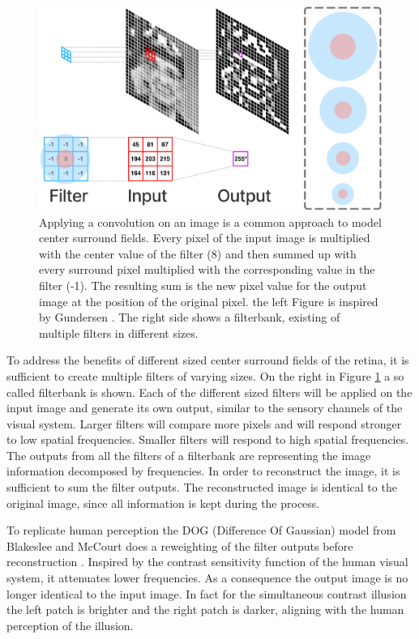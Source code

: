 \begin{figure}[H]
    \centering
    \includegraphics[width=0.7\linewidth]{media/convolution.png}
    \begin{minipage}{0.8\textwidth}
    \caption{
    Applying a convolution on an image is a common approach to model center surround
    fields. 
    Every pixel of the input image is multiplied with the center value of the filter (8)
    and then summed up with every surround pixel multiplied with the corresponding value
    in the filter (-1). The resulting sum is the new pixel value for the output image at
    the position of the original pixel. the left Figure is inspired by Gundersen
    \parencite*{Gundersen2017}. The right side shows a filterbank, existing of multiple
    filters in different sizes.}
    \label{fig:figure5}
    \end{minipage}
\end{figure}

To address the benefits of different sized center surround fields of the retina, it is
sufficient to create multiple filters of varying sizes. On the right in Figure
\ref{fig:figure5} a so called filterbank is shown. Each of the different sized filters
will be applied on the input image and generate its own output, similar to the sensory
channels of the visual system. Larger filters will compare more pixels and will respond
stronger to low spatial frequencies. Smaller filters will respond to high spatial
frequencies. The outputs from all the filters of a filterbank are representing the image
information decomposed by frequencies. In order to reconstruct the image, it is sufficient
to sum the filter outputs. The reconstructed image is identical to the original
image, since all information is kept during the process.

To replicate human perception the DOG (Difference Of Gaussian) model from Blakeslee and
McCourt does a reweighting of the filter outputs before reconstruction
\parencite{Blakeslee1997}. Inspired by the contrast sensitivity function of the human
visual system, it attenuates lower frequencies. As a consequence the output image is no
longer identical to the input image. In fact for the simultaneous contrast illusion the
left patch is brighter and the right patch is darker, aligning with the human perception
of the illusion.


